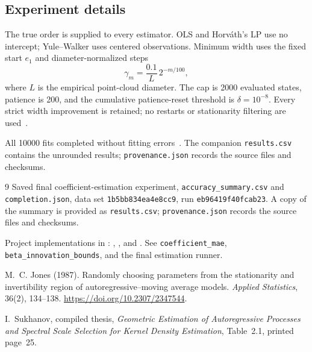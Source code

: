 \documentclass[a4paper,12pt]{scrartcl}
\begin{document}
\subsection*{Experiment details}
The true order is supplied to every estimator. OLS and Horv\'ath's LP use no
intercept; Yule--Walker uses centered observations. Minimum width uses the fixed
start $e_1$ and diameter-normalized steps
\[
\gamma_m=\frac{0.1}{L}\,2^{-m/100},
\]
where $L$ is the empirical point-cloud diameter. The cap is 2000 evaluated
states, patience is 200, and the cumulative patience-reset threshold is
$\delta=10^{-8}$. Every strict width improvement is retained; no restarts or
stationarity filtering are used~\cite{implementation}.

All 10000 fits completed without fitting errors~\cite{experiment}. The companion
\texttt{results.csv} contains the unrounded results; \texttt{provenance.json}
records the source files and checksums.

\begingroup
{}
\setlength{\parskip}{0pt}
\begin{thebibliography}{9}
\footnotesize
{}
Saved final coefficient-estimation experiment,
\texttt{accuracy\_summary.csv} and \texttt{completion.json},
data set \texttt{1b5bb834ea4e8cc9}, run \texttt{eb96419f40fcab23}.
A copy of the summary is provided as \texttt{results.csv};
\texttt{provenance.json} records the source files and checksums.

Project implementations in :
,
, and .
See \texttt{coefficient\_mae}, \texttt{beta\_innovation\_bounds}, and the
final estimation runner.

M.~C. Jones (1987).
Randomly choosing parameters from the stationarity and invertibility region
of autoregressive--moving average models.
\emph{Applied Statistics}, 36(2), 134--138.
\url{https://doi.org/10.2307/2347544}.

I.~Sukhanov, compiled thesis,
\emph{Geometric Estimation of Autoregressive Processes and Spectral Scale
Selection for Kernel Density Estimation}, Table~2.1, printed page~25.
\end{thebibliography}
\endgroup
\end{document}
